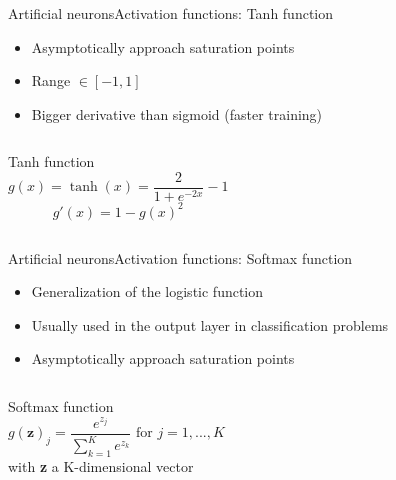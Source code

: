 \documentclass[10pt,compress]{beamer} %
\begin{document}
\begin{frame}{Artificial neurons}{Activation functions: Tanh function}
    \begin{itemize}
	    \item Asymptotically approach saturation points
        \item Range $\in [-1, 1]$
        \item Bigger derivative than sigmoid (faster training)
    \end{itemize}

    \begin{columns}

                 
	    \begin{block}{Tanh function}
	        \begin{equation*}
	        g(x) = \tanh(x) = \frac{2}{1+e^{-2x}}-1
	        \end{equation*}
	        \begin{equation*}
            g'(x) = 1 - g(x)^2
	        \end{equation*}
	    \end{block}
    \end{columns}
\end{frame}

\begin{frame}{Artificial neurons}{Activation functions: Softmax function}
	\begin{itemize}
		\item Generalization of the logistic function
		\item Usually used in the output layer in classification problems
		\item Asymptotically approach saturation points
	\end{itemize}

    \begin{columns}
	    \begin{block}{Softmax function}
	    \begin{equation*}
	    g(\pmb z)_j = \frac{e^{z_j}}{\sum_{k=1}^{K}e^{z_k}} \text{ for } j=1, ...,K
	    \end{equation*}
	    with  \textbf{z} a K-dimensional vector
	    \end{block}
    \end{columns}
\end{frame}
\end{document}
